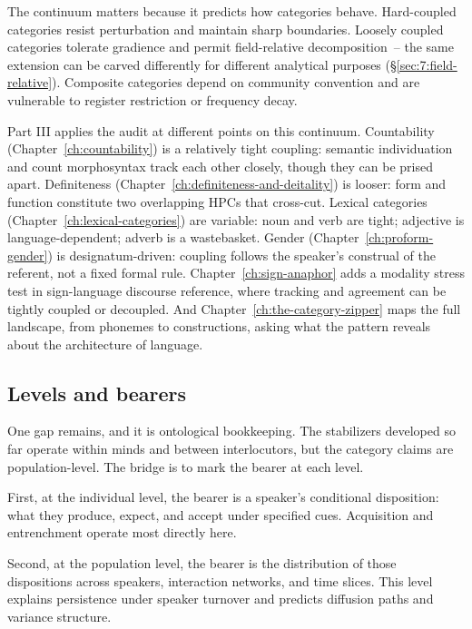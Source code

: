 The continuum matters because it predicts how categories behave. Hard-coupled categories resist perturbation and maintain sharp boundaries. Loosely coupled categories tolerate gradience and permit field-relative decomposition~-- the same extension can be carved differently for different analytical purposes (§\ref{sec:7:field-relative}). Composite categories depend on community convention and are vulnerable to register restriction or frequency decay.

Part III applies the audit at different points on this continuum. Countability (Chapter~\ref{ch:countability}) is a relatively tight coupling: semantic individuation and count morphosyntax track each other closely, though they can be prised apart. Definiteness (Chapter~\ref{ch:definiteness-and-deitality}) is looser: form and function constitute two overlapping HPCs that cross-cut. Lexical categories (Chapter~\ref{ch:lexical-categories}) are variable: noun and verb are tight; adjective is language-dependent; adverb is a wastebasket. Gender (Chapter~\ref{ch:proform-gender}) is designatum-driven: coupling follows the speaker's construal of the referent, not a fixed formal rule. Chapter~\ref{ch:sign-anaphor} adds a modality stress test in sign-language discourse reference, where tracking and agreement can be tightly coupled or decoupled. And Chapter~\ref{ch:the-category-zipper} maps the full landscape, from phonemes to constructions, asking what the pattern reveals about the architecture of language.

\subsection{Levels and bearers}
\label{sec:8:levels-bearers}

One gap remains, and it is ontological bookkeeping. The stabilizers developed so far operate within minds and between interlocutors, but the category claims are population-level. The bridge is to mark the bearer at each level.

First, at the individual level, the bearer is a speaker's conditional disposition: what they produce, expect, and accept under specified cues. Acquisition and entrenchment operate most directly here.

Second, at the population level, the bearer is the distribution of those dispositions across speakers, interaction networks, and time slices. This level explains persistence under speaker turnover and predicts diffusion paths and variance structure.

